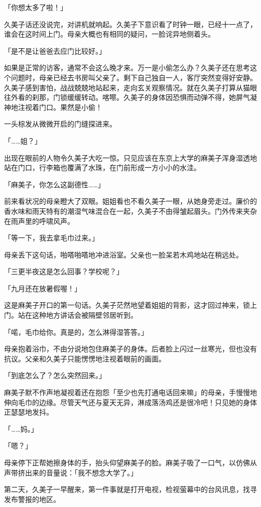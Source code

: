 \documentclass[UTF8]{ctexart}
\begin{document}
    「你想太多了啦！」 

    久美子话还没说完，对讲机就响起。久美子下意识看了时钟一眼，已经十一点了，谁会在这时间上门。母亲大概也有相同的疑问，一脸诧异地侧着头。 

    「是不是让爸爸去应门比较好。」 

    如果是正常的访客，通常不会这么晚才来。万一是小偷怎么办？久美子还在思考这个问题时，母亲已经去书房叫父亲了。剩下自己独自一人，客厅突然变得好安静。久美子感到害怕，战战兢兢地站起来，走向玄关观察情况。就在久美子打算从猫眼往外看的刹那，门锁缓缓转动。喀嚓。久美子的身体因恐惧而动弹不得，她屏气凝神地注视着门口。果然是小偷！ 

    一头棕发从微微开启的门缝探进来。 

    「……姐？」 

    出现在眼前的人物令久美子大吃一惊。只见应该在东京上大学的麻美子浑身湿透地站在门口，行李箱也覆满了水珠，在门前形成一方小小的水洼。 

    「麻美子，你怎么这副德性……」 

    前来看状况的母亲瞪大了双眼。姐姐看也不看久美子一眼，从她身旁走过。廉价的香水味和雨天特有的潮湿气味混合在一起，久美子不由得皱起眉头。门外传来夹杂在雨声里的呼啸风声。 

    「等一下，我去拿毛巾过来。」 

    母亲丢下这句话，啪嗒啪嗒地冲进浴室。父亲也一脸呆若木鸡地站在稍远处。 

    「三更半夜这是怎么回事？学校呢？」 

    「九月还在放暑假喔！」 

    这是麻美子开口的第一句话。久美子茫然地望着姐姐的背影，这才回过神来，锁上门。站在这种地方讲话会被隔壁邻居听到。 

    「喏，毛巾给你。真是的，怎么淋得湿答答。」 

    母亲抱着浴巾，不由分说地包住麻美子的身体。后者脸上闪过一丝寒光，但也没有抗议。父亲和久美子只能愣愣地注视着眼前的画面。 

    「到底怎么了？怎么突然回来。」 

    麻美子默不作声地凝视着还在抱怨「至少也先打通电话回来嘛」的母亲，手慢慢地伸向毛巾的边缘。尽管天气还与夏天无异，淋成落汤鸡还是很冷吧！只见她的身体正瑟瑟地发抖。 

    「……妈。」 

    「嗯？」 

    母亲停下正帮她擦身体的手，抬头仰望麻美子的脸。麻美子吸了一口气，以仿佛从声带挤出来的音量说：「我不想念大学了。」 

    第二天，久美子一早醒来，第一件事就是打开电视，检视萤幕中的台风讯息，找寻发布警报的地区。 
\end{document}
